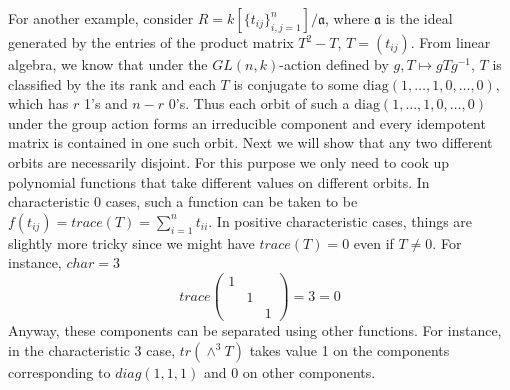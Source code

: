 \begin{example}
\label{example-idempotent-matrices}
For another example, consider
$R = k[\{t_{ij}\}_{i, j = 1}^{n}]/\mathfrak a$, where $\mathfrak a$ is
the ideal generated by the entries of the product matrix $T^2-T$,
$T = (t_{ij})$. From linear algebra, we know that under the
$GL(n, k)$-action defined by $g, T \mapsto gTg^{-1}$, $T$ is
classified by the its rank and each $T$ is conjugate to some
$\text{diag}(1, \ldots, 1, 0, \ldots, 0)$, which has $r$ 1's and $n-r$ 0's.
Thus each orbit of such a $\text{diag}(1, \ldots, 1, 0, \ldots, 0)$ under the
group action forms an irreducible component and every idempotent
matrix is contained in one such orbit. Next we will show that any
two different orbits are necessarily disjoint. For this purpose we
only need to cook up polynomial functions that take different
values on different orbits. In characteristic 0 cases, such a
function can be taken to be
$f(t_{ij}) = trace(T) = \sum_{i = 1}^nt_{ii}$. In positive
characteristic cases, things are slightly more tricky since we
might have $trace(T) = 0$ even if $T \neq 0$. For instance, $char = 3$
$$
trace\left(
\begin{matrix}
1 & & \\
& 1 & \\
& & 1
\end{matrix}
\right) = 3 = 0
$$
Anyway, these components can be separated using other functions.
For instance, in the characteristic 3 case, $tr(\wedge^3T)$ takes
value 1 on the components corresponding to $diag(1, 1, 1)$ and 0 on
other components.
\end{example}